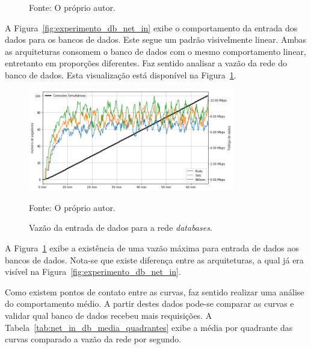 \begin{figure}[htb!]
    Fonte: O próprio autor.
\end{figure}

A Figura~\ref{fig:experimento_db_net_in} exibe o comportamento da entrada dos dados para os bancos de dados.
%
Este segue um padrão visivelmente linear.
%
Ambas as arquiteturas consomem o banco de dados com o mesmo comportamento linear, entretanto em proporções diferentes.
%
Faz sentido analisar a vazão da rede do banco de dados.
%
Esta visualização está disponível na Figura~\ref{fig:net_in_db}.

\begin{figure}[htb!]
  \caption{Vazão da entrada de dados para a rede \textit{databases}.}
  \label{fig:net_in_db}
  \includegraphics[width=0.8\textwidth]{figuras/analise/net_in_db.png}
  \centering

  Fonte: O próprio autor.
\end{figure}

A Figura~\ref{fig:net_in_db} exibe a existência de uma vazão máxima para entrada de dados aos bancos de dados.
%
Nota-se que existe diferença entre as arquiteturas, a qual já era visível na Figura~\ref{fig:experimento_db_net_in}.

Como existem pontos de contato entre as curvas, faz sentido realizar uma análise do comportamento médio.
%
A partir destes dados pode-se comparar as curvas e validar qual banco de dados recebeu mais requisições.
%
A Tabela~\ref{tab:net_in_db_media_quadrantes} exibe a média por quadrante das curvas comparado a vazão da rede por segundo.

